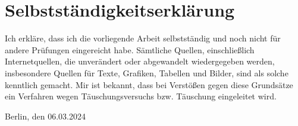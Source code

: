 \documentclass{scrartcl}
\theoremstyle{plain}
\theoremstyle{definition}
\begin{document}

\cleardoublepage
\thispagestyle{empty}

\section*{Selbstständigkeitserklärung}

Ich erkläre, dass ich die vorliegende Arbeit selbstständig und noch nicht für andere Prüfungen eingereicht habe. Sämtliche Quellen, einschließlich Internetquellen, die unverändert oder abgewandelt wiedergegeben werden, insbesondere Quellen für Texte, Grafiken, Tabellen und Bilder, sind als solche kenntlich gemacht. Mir ist bekannt, dass bei Verstößen gegen diese Grundsätze ein Verfahren wegen Täuschungsversuchs bzw. Täuschung eingeleitet wird.


\vspace{2\baselineskip}
{\raggedright Berlin, den 06.03.2024 \hfill \TitelPunktLinie{8cm}\\}
\end{document}
